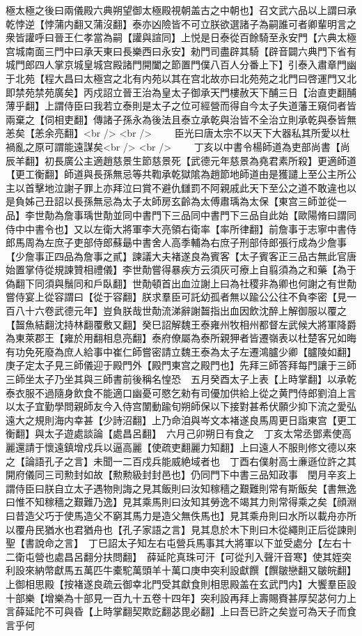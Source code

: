 極太極之後曰兩儀殿六典朔望御太極殿視朝盖古之中朝也】召文武六品以上謂曰承乾悖逆【悖蒲内翻又蒲沒翻】泰亦凶險皆不可立朕欲選諸子為嗣誰可者卿輩明言之衆皆讙呼曰晉王仁孝當為嗣【讙與諠同】上悦是日泰從百餘騎至永安門【六典太極宫城南面三門中曰承天東曰長樂西曰永安】勑門司盡辟其騎【辟音闢六典門下省有城門郎四人掌京城皇城宫殿諸門開闔之節置門僕八百人分番上下】引泰入肅章門幽于北苑【程大昌曰太極宫之北有内苑以其在宫北故亦曰北苑苑之北門曰啓運門又北即禁苑禁苑廣矣】丙戍詔立晉王治為皇太子御承天門樓赦天下酺三日【治直吏翻酺薄乎翻】上謂侍臣曰我若立泰則是太子之位可經營而得自今太子失道藩王窺伺者皆兩棄之【伺相吏翻】傳諸子孫永為後法且泰立承乾與治皆不全治立則承乾與泰皆無恙矣【恙余亮翻】<br />
<br />
　　臣光曰唐太宗不以天下大器私其所愛以杜禍亂之原可謂能遠謀矣<br />
<br />
　　丁亥以中書令楊師道為吏部尚書【尚辰羊翻】初長廣公主適趙慈景生節慈景死【武德元年慈景為堯君素所殺】更適師道【更工衡翻】師道與長孫無忌等共鞫承乾獄隂為趙節地師道由是獲譴上至公主所公主以首擊地泣謝子罪上亦拜泣曰賞不避仇讎罰不阿親戚此天下至公之道不敢違也以是負姊己丑詔以長孫無忌為太子太師房玄齡為太傅肅瑀為太保【東宫三師並從一品】李世勣為詹事瑀世勣並同中書門下三品同中書門下三品自此始【歐陽脩曰謂同侍中中書令也】又以左衛大將軍李大亮領右衛率【率所律翻】前詹事于志寧中書侍郎馬周為左庶子吏部侍郎蘇朂中書舍人高季輔為右庶子刑部侍郎張行成為少詹事【少詹事正四品為詹事之貳】諫議大夫褚遂良為賓客【太子賓客正三品古無此官唐始置掌侍從規諫贊相禮儀】李世勣嘗得暴疾方云須灰可療上自翦須為之和藥【為于偽翻下同須與鬚同和戶臥翻】世勣頓首出血泣謝上曰為社稷非為卿也何謝之有世勣嘗侍宴上從容謂曰【從于容翻】朕求羣臣可託幼孤者無以踰公公往不負李密【見一百八十六卷武德元年】豈負朕哉世勣流涕辭謝齧指出血因飲沈醉上解御服以覆之【齧魚結翻沈持林翻覆敷又翻】癸巳詔解魏王泰雍州牧相州都督左武候大將軍降爵為東萊郡王【雍於用翻相息亮翻】泰府僚屬為泰所親狎者皆遷嶺表以杜楚客兄如晦有功免死廢為庶人給事中崔仁師嘗密請立魏王泰為太子左遷鴻臚少卿【臚陵如翻】庚子定太子見三師儀迎于殿門外【殿門東宫之殿門也】先拜三師答拜每門讓于三師三師坐太子乃坐其與三師書前後稱名惶恐　五月癸酉太子上表【上時掌翻】以承乾泰衣服不過隨身飲食不能適口幽憂可愍乞勑有司優加供給上從之黄門侍郎劉洎上言以太子宜勤學問親師友今入侍宫闈動踰旬朔師保以下接對甚希伏願少抑下流之愛弘遠大之規則海内幸甚【少詩沼翻】上乃命洎與岑文本褚遂良馬周更日詣東宫【更工衡翻】與太子遊處談論【處昌呂翻】　六月己卯朔日有食之　丁亥太常丞鄧素使高麗還請于懷遠鎮增戍兵以逼高麗【使疏吏翻麗力知翻】上曰遠人不服則修文德以來之【論語孔子之言】未聞一二百戍兵能威絶域者也　丁酉右僕射高士亷遜位許之其開府儀同三司勲封如故【勲勲級封封邑也】仍同門下中書三品知政事　閏月辛亥上謂侍臣曰朕自立太子遇物則誨之見其飯則曰汝知稼穡之艱難則常有斯飯矣【書無逸曰惟不知稼穡之艱難乃逸】見其乘馬則曰汝知其勞逸不竭其力則常得乘之矣【顔淵曰昔造父巧于使馬造父不窮其馬力是造父無佚馬也】見其乘舟則曰水所以載舟亦所以覆舟民猶水也君猶舟也【孔子家語之言】見其息於木下則曰木從繩則正后從諫則聖【書說命之言】　丁巳詔太子知左右屯營兵馬事其大將軍以下並受處分【左右十二衛屯營也處昌呂翻分扶問翻】　薛延陀真珠可汗【可從刋入聲汗音寒】使其姪突利設來納幣獻馬五萬匹牛橐駝萬頭羊十萬口庚申突利設獻饌【饌皺戀翻又皺皖翻】上御相思殿【按褚遂良疏云御幸北門受其獻食則相思殿盖在玄武門内】大饗羣臣設十部樂【增樂為十部見一百九十五卷十四年】突利設再拜上壽賜賚甚厚契苾何力上言薛延陀不可與昏【上時掌翻契欺訖翻苾毘必翻】上曰吾已許之矣豈可為天子而食言乎何